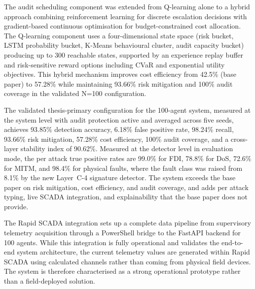 \par \vspace{0.35cm}

\noindent
The audit scheduling component was extended from Q-learning alone to a hybrid approach combining reinforcement learning for discrete escalation decisions with gradient-based continuous optimisation for budget-constrained cost allocation. The Q-learning component uses a four-dimensional state space (risk bucket, LSTM probability bucket, K-Means behavioural cluster, audit capacity bucket) producing up to 300 reachable states, supported by an experience replay buffer and risk-sensitive reward options including CVaR and exponential utility objectives. This hybrid mechanism improves cost efficiency from 42.5\% (base paper) to 57.28\% while maintaining 93.66\% risk mitigation and 100\% audit coverage in the validated N=100 configuration.

\par \vspace{0.35cm}

\noindent
The validated thesis-primary configuration for the 100-agent system, measured at the system level with audit protection active and averaged across five seeds, achieves 93.85\% detection accuracy, 6.18\% false positive rate, 98.24\% recall, 93.66\% risk mitigation, 57.28\% cost efficiency, 100\% audit coverage, and a cross-layer stability index of 90.62\%. Measured at the detector level in evaluation mode, the per attack true positive rates are 99.0\% for FDI, 78.8\% for DoS, 72.6\% for MITM, and 98.4\% for physical faults, where the fault class was raised from 8.1\% by the new Layer~C-4 signature detector. The system exceeds the base paper on risk mitigation, cost efficiency, and audit coverage, and adds per attack typing, live SCADA integration, and explainability that the base paper does not provide.

\par \vspace{0.35cm}

\noindent
The Rapid SCADA integration sets up a complete data pipeline from supervisory telemetry acquisition through a PowerShell bridge to the FastAPI backend for 100 agents. While this integration is fully operational and validates the end-to-end system architecture, the current telemetry values are generated within Rapid SCADA using calculated channels rather than coming from physical field devices. The system is therefore characterised as a strong operational prototype rather than a field-deployed solution.

